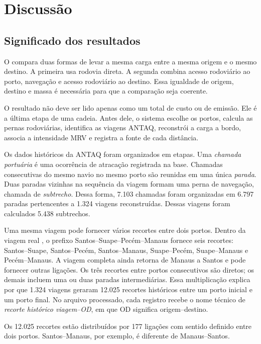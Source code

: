 \chapter{Discussão}
\label{ch:discussao}

\section{Significado dos resultados}
\label{sec:pergunta-discussao}

O \CabotageLens{} compara duas formas de levar a mesma carga entre a mesma origem e o mesmo destino. A primeira usa rodovia direta. A segunda combina acesso rodoviário ao porto, navegação e acesso rodoviário ao destino. Essa igualdade de origem, destino e massa é necessária para que a comparação seja coerente.

O resultado não deve ser lido apenas como um total de custo ou de emissão. Ele é a última etapa de uma cadeia. Antes dele, o sistema escolhe os portos, calcula as pernas rodoviárias, identifica as viagens ANTAQ, reconstrói a carga a bordo, associa a intensidade MRV e registra a fonte de cada distância.

Os dados históricos da ANTAQ foram organizados em etapas. Uma \emph{chamada portuária} é uma ocorrência de atracação registrada na base. Chamadas consecutivas do mesmo navio no mesmo porto são reunidas em uma única \emph{parada}. Duas paradas vizinhas na sequência da viagem formam uma perna de navegação, chamada de \emph{subtrecho}. Dessa forma, 7.103 chamadas foram organizadas em 6.797 paradas pertencentes a 1.324 viagens reconstruídas. Dessas viagens foram calculados 5.438 subtrechos.

Uma mesma viagem pode fornecer vários recortes entre dois portos. Dentro da viagem real , o prefixo Santos--Suape--Pecém--Manaus fornece seis recortes: Santos--Suape, Santos--Pecém, Santos--Manaus, Suape--Pecém, Suape--Manaus e Pecém--Manaus. A viagem completa ainda retorna de Manaus a Santos e pode fornecer outras ligações. Os três recortes entre portos consecutivos são diretos; os demais incluem uma ou duas paradas intermediárias. Essa multiplicação explica por que 1.324 viagens geraram 12.025 recortes históricos entre um porto inicial e um porto final. No arquivo processado, cada registro recebe o nome técnico de \emph{recorte histórico viagem--OD}, em que OD significa origem--destino.

Os 12.025 recortes estão distribuídos por 177 ligações com sentido definido entre dois portos. Santos--Manaus, por exemplo, é diferente de Manaus--Santos.

